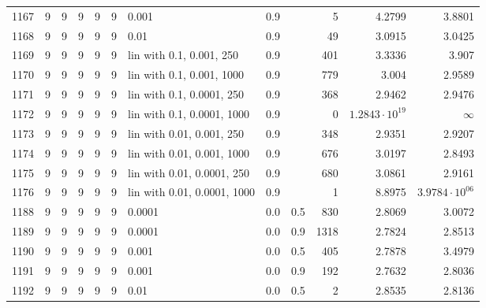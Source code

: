 \begin{longtable}{lrrrrrlrrrrr}
 1167 &       9 & 9 & 9 & 9 & 9 &                       0.001 &      0.9 &        &       5 &                 4.2799 &                 3.8801 \\
 1168 &       9 & 9 & 9 & 9 & 9 &                        0.01 &      0.9 &        &      49 &                 3.0915 &                 3.0425 \\
 1169 &       9 & 9 & 9 & 9 & 9 &    lin with 0.1, 0.001, 250 &      0.9 &        &     401 &                 3.3336 &                  3.907 \\
 1170 &       9 & 9 & 9 & 9 & 9 &   lin with 0.1, 0.001, 1000 &      0.9 &        &     779 &                  3.004 &                 2.9589 \\
 1171 &       9 & 9 & 9 & 9 & 9 &   lin with 0.1, 0.0001, 250 &      0.9 &        &     368 &                 2.9462 &                 2.9476 \\
 1172 &       9 & 9 & 9 & 9 & 9 &  lin with 0.1, 0.0001, 1000 &      0.9 &        &       0 &  $1.2843\cdot 10^{19}$ &               $\infty$ \\
 1173 &       9 & 9 & 9 & 9 & 9 &   lin with 0.01, 0.001, 250 &      0.9 &        &     348 &                 2.9351 &                 2.9207 \\
 1174 &       9 & 9 & 9 & 9 & 9 &  lin with 0.01, 0.001, 1000 &      0.9 &        &     676 &                 3.0197 &                 2.8493 \\
 1175 &       9 & 9 & 9 & 9 & 9 &  lin with 0.01, 0.0001, 250 &      0.9 &        &     680 &                 3.0861 &                 2.9161 \\
 1176 &       9 & 9 & 9 & 9 & 9 & lin with 0.01, 0.0001, 1000 &      0.9 &        &       1 &                 8.8975 &  $3.9784\cdot 10^{06}$ \\
 1188 &       9 & 9 & 9 & 9 & 9 &                      0.0001 &      0.0 &    0.5 &     830 &                 2.8069 &                 3.0072 \\
 1189 &       9 & 9 & 9 & 9 & 9 &                      0.0001 &      0.0 &    0.9 &    1318 &                 2.7824 &                 2.8513 \\
 1190 &       9 & 9 & 9 & 9 & 9 &                       0.001 &      0.0 &    0.5 &     405 &                 2.7878 &                 3.4979 \\
 1191 &       9 & 9 & 9 & 9 & 9 &                       0.001 &      0.0 &    0.9 &     192 &                 2.7632 &                 2.8036 \\
 1192 &       9 & 9 & 9 & 9 & 9 &                        0.01 &      0.0 &    0.5 &       2 &                 2.8535 &                 2.8136 \\

\end{longtable}
